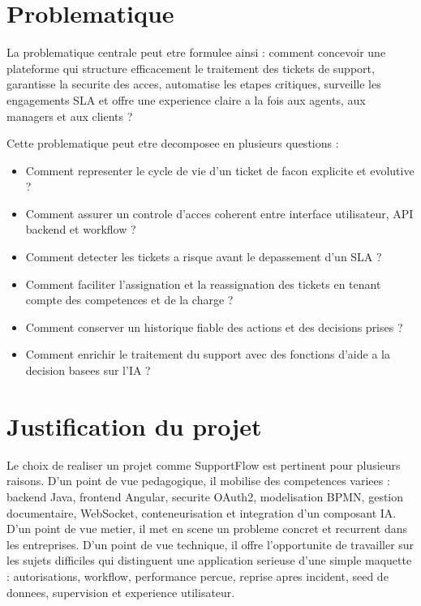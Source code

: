 \documentclass[12pt,a4paper,oneside]{report}
\begin{document}
\section{Problematique}

La problematique centrale peut etre formulee ainsi : comment concevoir une plateforme qui structure efficacement le traitement des tickets de support, garantisse la securite des acces, automatise les etapes critiques, surveille les engagements SLA et offre une experience claire a la fois aux agents, aux managers et aux clients ?

Cette problematique peut etre decomposee en plusieurs questions :

\begin{itemize}[leftmargin=1.2cm]
  \item Comment representer le cycle de vie d'un ticket de facon explicite et evolutive ?
  \item Comment assurer un controle d'acces coherent entre interface utilisateur, API backend et workflow ?
  \item Comment detecter les tickets a risque avant le depassement d'un SLA ?
  \item Comment faciliter l'assignation et la reassignation des tickets en tenant compte des competences et de la charge ?
  \item Comment conserver un historique fiable des actions et des decisions prises ?
  \item Comment enrichir le traitement du support avec des fonctions d'aide a la decision basees sur l'IA ?
\end{itemize}

\section{Justification du projet}

Le choix de realiser un projet comme SupportFlow est pertinent pour plusieurs raisons. D'un point de vue pedagogique, il mobilise des competences variees : backend Java, frontend Angular, securite OAuth2, modelisation BPMN, gestion documentaire, WebSocket, conteneurisation et integration d'un composant IA. D'un point de vue metier, il met en scene un probleme concret et recurrent dans les entreprises. D'un point de vue technique, il offre l'opportunite de travailler sur les sujets difficiles qui distinguent une application serieuse d'une simple maquette : autorisations, workflow, performance percue, reprise apres incident, seed de donnees, supervision et experience utilisateur.
\end{document}
